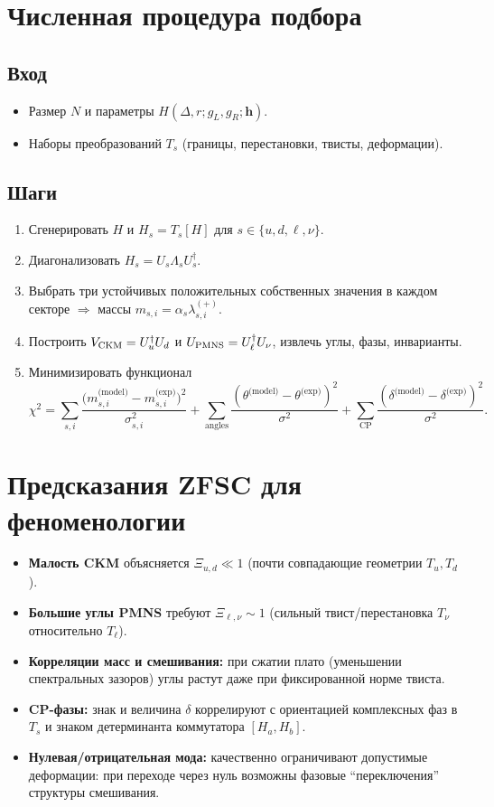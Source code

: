 \documentclass[12pt,a4paper]{article}
\begin{document}
\section{Численная процедура подбора}
\subsection*{Вход}
\begin{itemize}
\item Размер $N$ и параметры $H(\Delta,r;g_L,g_R;\bm{h})$.
\item Наборы преобразований $T_s$ (границы, перестановки, твисты, деформации).
\end{itemize}
\subsection*{Шаги}
\begin{enumerate}
\item Сгенерировать $H$ и $H_s=T_s[H]$ для $s\in\{u,d,\ell,\nu\}$.
\item Диагонализовать $H_s=U_s\Lambda_s U_s^\dagger$.
\item Выбрать три устойчивых положительных собственных значения в каждом секторе $\Rightarrow$ массы $m_{s,i}=\alpha_s\lambda_{s,i}^{(+)}$.
\item Построить $V_{\rm CKM}=U_u^\dagger U_d$ и $U_{\rm PMNS}=U_\ell^\dagger U_\nu$, извлечь углы, фазы, инварианты.
\item Минимизировать функционал
\[
\chi^2 = \sum_{s,i}\frac{\big(m_{s,i}^{\text{(model)}}-m_{s,i}^{\text{(exp)}}\big)^2}{\sigma_{s,i}^2}
+\sum_{\text{angles}}\frac{(\theta^{\text{(model)}}-\theta^{\text{(exp)}})^2}{\sigma^2}
+\sum_{\text{CP}}\frac{(\delta^{\text{(model)}}-\delta^{\text{(exp)}})^2}{\sigma^2}.
\]
\end{enumerate}

\section{Предсказания ZFSC для феноменологии}
\begin{itemize}
\item \textbf{Малость CKM} объясняется $\Xi_{u,d}\ll 1$ (почти совпадающие геометрии $T_u,T_d$).
\item \textbf{Большие углы PMNS} требуют $\Xi_{\ell,\nu}\sim 1$ (сильный твист/перестановка $T_\nu$ относительно $T_\ell$).
\item \textbf{Корреляции масс и смешивания:} при сжатии плато (уменьшении спектральных зазоров) углы растут даже при фиксированной норме твиста.
\item \textbf{CP-фазы:} знак и величина $\delta$ коррелируют с ориентацией комплексных фаз в $T_s$ и знаком детерминанта коммутатора $[H_a,H_b]$.
\item \textbf{Нулевая/отрицательная мода:} качественно ограничивают допустимые деформации: при переходе через нуль возможны фазовые ``переключения'' структуры смешивания.
\end{itemize}
\end{document}

